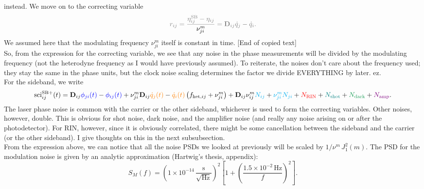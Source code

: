 \documentclass[11pt]{article}
\begin{document}
instead. We move on to the correcting variable
\begin{equation}
\color{gray}
    r_{ij}=\frac{\eta^{\text{SB}}_{ij}-\eta_{ij}}{\color{black}\nu_{ji}^m} = \mathbf{D}_{ij} \dot{q}_j-\dot{q}_i. \label{rij}
\end{equation}
We assumed here that the modulating frequency $\nu_{j i}^{m}$ itself is constant in time. [End of copied text]\\
\newline
So, from the expression for the correcting variable, we see that any noise in the phase measurements will be divided by the modulating frequency (not the heterodyne frequency as I would have previously assumed). To reiterate, the noises don't care about the frequency used; they stay the same in the phase units, but the clock noise scaling determines the factor we divide EVERYTHING by later. ez.\\
\newline
For the sideband, we write
\begin{equation*}
    \text{sci}_{ij}^{\text{SB}+}(t) = \mathbf{D}_{ij}{\color{blue}\phi_{ji}(t)}-{\color{blue}\phi_{ij}(t)}+\nu_{j i}^{m} \mathbf{D}_{ij} {\color{orange}\dot{q}_j(t)} -{\color{orange}\dot{q}_i (t)}\left( f_{\text{het,}ij} + \nu_{j i}^{m} \right) + \mathbf{D}_{ij}\nu_{ij}^{m}{\color{cyan}N_{ij}}+ {\color{cyan}\nu_{j i}^{m}N_{ji}} + {\color{red}N_{\text{RIN}}}+ {\color{teal}N_{\text{shot}}}+ {\color{ForestGreen}N_{\text{dark}}}+ {\color{violet}N_{\text{amp}}}.
\end{equation*}
The laser phase noise is common with the carrier or the other sideband, whichever is used to form the correcting variables. Other noises, however, double. This is obvious for shot noise, dark noise, and the amplifier noise (and really any noise arising on or after the photodetector). For RIN, however, since it is obviously correlated, there might be some cancellation between the sideband and the carrier (or the other sideband). I give thoughts on this in the next subsubsection.\\
\newline
From the expression above, we can notice that all the noise PSDs we looked at previously will be scaled by $1/\nu^m\,J_1^2(m)$. The PSD for the modulation noise is given by an analytic approximation (Hartwig's thesis, appendix):
\begin{equation*}
    S_M(f) = \left(1 \times 10^{-14}\,\frac{\mathrm{s}}{\sqrt{\mathrm{Hz}}}\right)^2
\left[1 + \left(\frac{1.5 \times 10^{-2}\,\mathrm{Hz}}{f}\right)^2\right].
\end{equation*}
\end{document}
